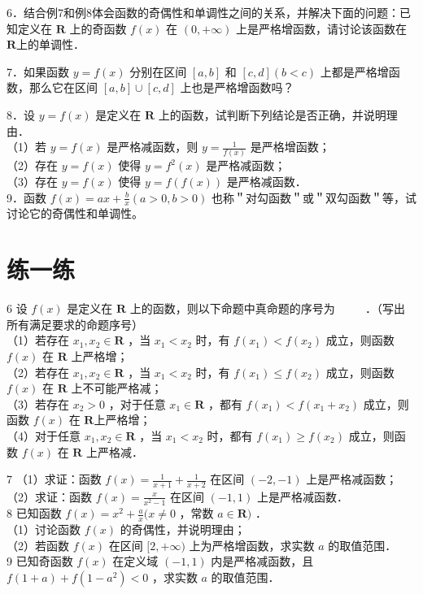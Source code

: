 \documentclass[10pt]{article}
\begin{document}
6．结合例7和例8体会函数的奇偶性和单调性之间的关系，并解决下面的问题：已知定义在 \(\mathbf{R}\) 上的奇函数 \(f(x)\) 在 \((0,+\infty)\) 上是严格增函数，请讨论该函数在 \(\mathbf{R}\)上的单调性．

7．如果函数 \(y=f(x)\) 分别在区间 \([a, b]\) 和 \([c, d](b<c)\) 上都是严格增函数，那么它在区间 \([a, b] \cup[c, d]\) 上也是严格增函数吗？

8．设 \(y=f(x)\) 是定义在 \(\mathbf{R}\) 上的函数，试判断下列结论是否正确，并说明理由．\\
（1）若 \(y=f(x)\) 是严格减函数，则 \(y=\frac{1}{f(x)}\) 是严格增函数；\\
（2）存在 \(y=f(x)\) 使得 \(y=f^{2}(x)\) 是严格减函数；\\
（3）存在 \(y=f(x)\) 使得 \(y=f(f(x))\) 是严格减函数．\\
9．函数 \(f(x)=a x+\frac{b}{x}(a>0, b>0)\) 也称＂对勾函数＂或＂双勾函数＂等，试讨论它的奇偶性和单调性。

\section*{练一练}
6 设 \(f(x)\) 是定义在 \(\mathbf{R}\) 上的函数，则以下命题中真命题的序号为 \(\qquad\) ．（写出所有满足要求的命题序号）\\
（1）若存在 \(x_{1}, x_{2} \in \mathbf{R}\) ，当 \(x_{1}<x_{2}\) 时，有 \(f\left(x_{1}\right)<f\left(x_{2}\right)\) 成立，则函数 \(f(x)\) 在 \(\mathbf{R}\) 上严格增；\\
（2）若存在 \(x_{1}, x_{2} \in \mathbf{R}\) ，当 \(x_{1}<x_{2}\) 时，有 \(f\left(x_{1}\right) \leqslant f\left(x_{2}\right)\) 成立，则函数 \(f(x)\) 在 \(\mathbf{R}\) 上不可能严格减；\\
（3）若存在 \(x_{2}>0\) ，对于任意 \(x_{1} \in \mathbf{R}\) ，都有 \(f\left(x_{1}\right)<f\left(x_{1}+x_{2}\right)\) 成立，则函数 \(f(x)\) 在 \(\mathbf{R}\)上严格增；\\
（4）对于任意 \(x_{1}, x_{2} \in \mathbf{R}\) ，当 \(x_{1}<x_{2}\) 时，都有 \(f\left(x_{1}\right) \geqslant f\left(x_{2}\right)\) 成立，则函数 \(f(x)\) 在 \(\mathbf{R}\) 上严格减．

7 （1）求证：函数 \(f(x)=\frac{1}{x+1}+\frac{1}{x+2}\) 在区间 \((-2,-1)\) 上是严格减函数；\\
（2）求证：函数 \(f(x)=\frac{x}{x^{2}-1}\) 在区间 \((-1,1)\) 上是严格减函数．\\
8 已知函数 \(f(x)=x^{2}+\frac{a}{x}(x \neq 0\) ，常数 \(a \in \mathbf{R})\) ．\\
（1）讨论函数 \(f(x)\) 的奇偶性，并说明理由；\\
（2）若函数 \(f(x)\) 在区间 \([2,+\infty)\) 上为严格增函数，求实数 \(a\) 的取值范围．\\
9 已知奇函数 \(f(x)\) 在定义域 \((-1,1)\) 内是严格减函数，且 \(f(1+a)+f\left(1-a^{2}\right)<0\) ，求实数 \(a\) 的取值范围．
\end{document}
